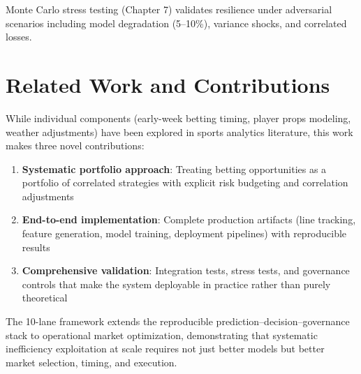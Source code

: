 Monte Carlo stress testing (Chapter 7) validates resilience under adversarial scenarios including model degradation (5--10\%), variance shocks, and correlated losses.

\section{Related Work and Contributions}

While individual components (early-week betting timing, player props modeling, weather adjustments) have been explored in sports analytics literature, this work makes three novel contributions:

\begin{enumerate}
  \item \textbf{Systematic portfolio approach}: Treating betting opportunities as a portfolio of correlated strategies with explicit risk budgeting and correlation adjustments
  \item \textbf{End-to-end implementation}: Complete production artifacts (line tracking, feature generation, model training, deployment pipelines) with reproducible results
  \item \textbf{Comprehensive validation}: Integration tests, stress tests, and governance controls that make the system deployable in practice rather than purely theoretical
\end{enumerate}

The 10-lane framework extends the reproducible prediction--decision--governance stack to operational market optimization, demonstrating that systematic inefficiency exploitation at scale requires not just better models but better market selection, timing, and execution.

